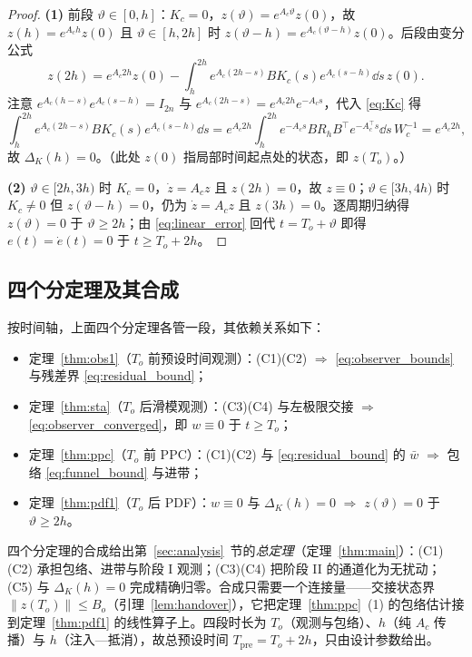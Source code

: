 \begin{proof}
\textbf{(1)} 前段 \(\vartheta\in[0,h]\)：\(K_c=0\)，\(z(\vartheta)=e^{A_c\vartheta}z(0)\)，故 \(z(h)=e^{A_ch}z(0)\) 且 \(\vartheta\in[h,2h]\) 时 \(z(\vartheta-h)=e^{A_c(\vartheta-h)}z(0)\)。后段由变分公式
\[
z(2h)=e^{A_c2h}z(0)-\int_h^{2h}e^{A_c(2h-s)}BK_c(s)e^{A_c(s-h)}\dd s\,z(0).
\]
注意 \(e^{A_c(h-s)}e^{A_c(s-h)}=I_{2n}\) 与 \(e^{A_c(2h-s)}=e^{A_c2h}e^{-A_cs}\)，代入 \eqref{eq:Kc} 得
\[
\int_h^{2h}e^{A_c(2h-s)}BK_c(s)e^{A_c(s-h)}\dd s
=e^{A_c2h}\int_h^{2h}e^{-A_cs}BR_hB^{\top}e^{-A_c^{\top}s}\dd s\,W_c^{-1}=e^{A_c2h},
\]
故 \(\Delta_K(h)=0\)。（此处 \(z(0)\) 指局部时间起点处的状态，即 \(z(T_o)\)。）

\textbf{(2)} \(\vartheta\in[2h,3h)\) 时 \(K_c=0\)，\(\dot z=A_cz\) 且 \(z(2h)=0\)，故 \(z\equiv0\)；\(\vartheta\in[3h,4h)\) 时 \(K_c\neq0\) 但 \(z(\vartheta-h)=0\)，仍为 \(\dot z=A_cz\) 且 \(z(3h)=0\)。逐周期归纳得 \(z(\vartheta)=0\) 于 \(\vartheta\ge2h\)；由 \eqref{eq:linear_error} 回代 \(t=T_o+\vartheta\) 即得 \(e(t)=\dot e(t)=0\) 于 \(t\ge T_o+2h\)。
\end{proof}

\subsection{四个分定理及其合成}
\label{sec:algo_proof}

按时间轴，上面四个分定理各管一段，其依赖关系如下：
\begin{itemize}
  \item 定理~\ref{thm:obs1}（\(T_o\) 前预设时间观测）：\textup{(C1)(C2)} \(\Rightarrow\) \eqref{eq:observer_bounds} 与残差界 \eqref{eq:residual_bound}；
  \item 定理~\ref{thm:sta}（\(T_o\) 后滑模观测）：\textup{(C3)(C4)} 与左极限交接 \(\Rightarrow\) \eqref{eq:observer_converged}，即 \(w\equiv0\) 于 \(t\ge T_o\)；
  \item 定理~\ref{thm:ppc}（\(T_o\) 前 PPC）：\textup{(C1)(C2)} 与 \eqref{eq:residual_bound} 的 \(\bar w\) \(\Rightarrow\) 包络 \eqref{eq:funnel_bound} 与进带；
  \item 定理~\ref{thm:pdf1}（\(T_o\) 后 PDF）：\(w\equiv0\) 与 \(\Delta_K(h)=0\) \(\Rightarrow\) \(z(\vartheta)=0\) 于 \(\vartheta\ge2h\)。
\end{itemize}
四个分定理的合成给出第~\ref{sec:analysis}~节的\emph{总定理}（定理~\ref{thm:main}）：\textup{(C1)(C2)} 承担包络、进带与阶段 I 观测；\textup{(C3)(C4)} 把阶段 II 的通道化为无扰动；\textup{(C5)} 与 \(\Delta_K(h)=0\) 完成精确归零。合成只需要一个连接量——交接状态界 \(\lVert z(T_o)\rVert\le B_o\)（引理~\ref{lem:handover}），它把定理~\ref{thm:ppc}~(1) 的包络估计接到定理~\ref{thm:pdf1} 的线性算子上。四段时长为 \(T_o\)（观测与包络）、\(h\)（纯 \(A_c\) 传播）与 \(h\)（注入—抵消），故总预设时间 \(T_{\mathrm{pre}}=T_o+2h\)，只由设计参数给出。

